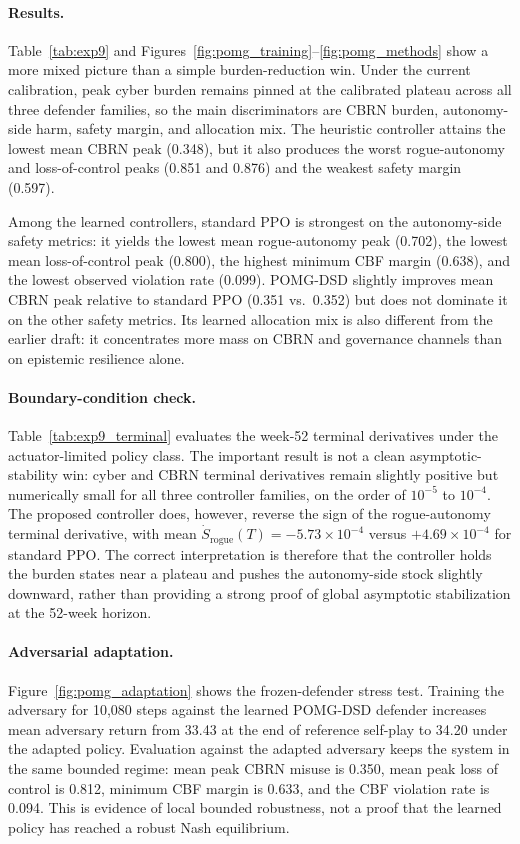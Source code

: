 \documentclass[11pt]{article}
\begin{document}
\paragraph{Results.} Table~\ref{tab:exp9} and Figures~\ref{fig:pomg_training}--\ref{fig:pomg_methods} show a more mixed picture than a simple burden-reduction win. Under the current calibration, peak cyber burden remains pinned at the calibrated plateau across all three defender families, so the main discriminators are CBRN burden, autonomy-side harm, safety margin, and allocation mix. The heuristic controller attains the lowest mean CBRN peak (0.348), but it also produces the worst rogue-autonomy and loss-of-control peaks (0.851 and 0.876) and the weakest safety margin (0.597).

Among the learned controllers, standard PPO is strongest on the autonomy-side safety metrics: it yields the lowest mean rogue-autonomy peak (0.702), the lowest mean loss-of-control peak (0.800), the highest minimum CBF margin (0.638), and the lowest observed violation rate (0.099). POMG-DSD slightly improves mean CBRN peak relative to standard PPO (0.351 vs.\ 0.352) but does not dominate it on the other safety metrics. Its learned allocation mix is also different from the earlier draft: it concentrates more mass on CBRN and governance channels than on epistemic resilience alone.

\paragraph{Boundary-condition check.} Table~\ref{tab:exp9_terminal} evaluates the week-52 terminal derivatives under the actuator-limited policy class. The important result is not a clean asymptotic-stability win: cyber and CBRN terminal derivatives remain slightly positive but numerically small for all three controller families, on the order of $10^{-5}$ to $10^{-4}$. The proposed controller does, however, reverse the sign of the rogue-autonomy terminal derivative, with mean $\dot{S}_{\text{rogue}}(T) = -5.73\times 10^{-4}$ versus $+4.69\times 10^{-4}$ for standard PPO. The correct interpretation is therefore that the controller holds the burden states near a plateau and pushes the autonomy-side stock slightly downward, rather than providing a strong proof of global asymptotic stabilization at the 52-week horizon.

\paragraph{Adversarial adaptation.} Figure~\ref{fig:pomg_adaptation} shows the frozen-defender stress test. Training the adversary for 10,080 steps against the learned POMG-DSD defender increases mean adversary return from 33.43 at the end of reference self-play to 34.20 under the adapted policy. Evaluation against the adapted adversary keeps the system in the same bounded regime: mean peak CBRN misuse is 0.350, mean peak loss of control is 0.812, minimum CBF margin is 0.633, and the CBF violation rate is 0.094. This is evidence of local bounded robustness, not a proof that the learned policy has reached a robust Nash equilibrium.
\end{document}
